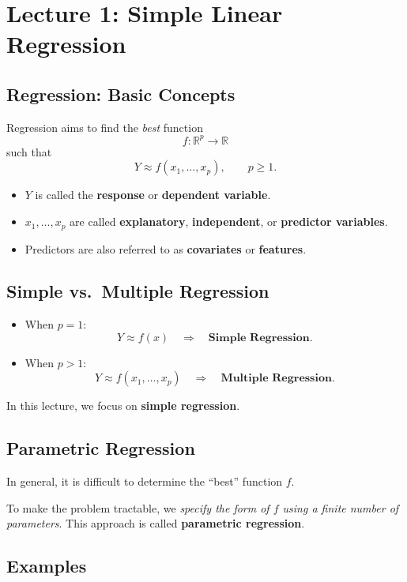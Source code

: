 \section{Lecture 1: Simple Linear Regression}

\subsection{Regression: Basic Concepts}

Regression aims to find the \emph{best} function
\[
f : \mathbb{R}^p \to \mathbb{R}
\]
such that
\[
Y \approx f(x_1, \dots, x_p), \qquad p \ge 1.
\]

\begin{itemize}
    \item $Y$ is called the \textbf{response} or \textbf{dependent variable}.
    \item $x_1, \dots, x_p$ are called \textbf{explanatory}, \textbf{independent}, or \textbf{predictor variables}.
    \item Predictors are also referred to as \textbf{covariates} or \textbf{features}.
\end{itemize}

\subsection{Simple vs.\ Multiple Regression}

\begin{itemize}
    \item When $p = 1$:
    \[
    Y \approx f(x) \quad \Rightarrow \quad \textbf{Simple Regression}.
    \]
    \item When $p > 1$:
    \[
    Y \approx f(x_1, \dots, x_p) \quad \Rightarrow \quad \textbf{Multiple Regression}.
    \]
\end{itemize}

In this lecture, we focus on \textbf{simple regression}.

\subsection{Parametric Regression}

In general, it is difficult to determine the ``best'' function $f$.

To make the problem tractable, we \emph{specify the form of $f$ using a finite number of parameters}.
This approach is called \textbf{parametric regression}.

\subsection{Examples}

